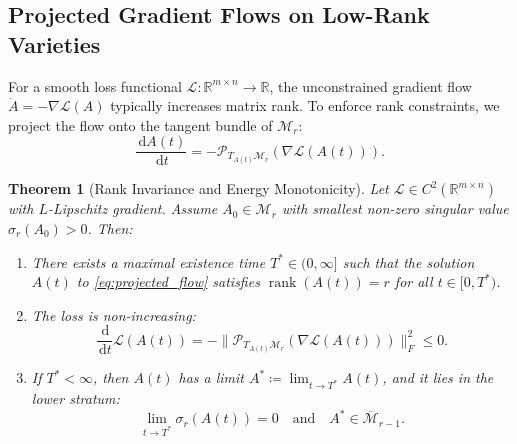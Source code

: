 \documentclass[11pt,a4paper,reqno]{amsart}
\newtheorem{theorem}{Theorem}[section]
\theoremstyle{definition}
\numberwithin{equation}{section}
\providecommand{\R}{\mathbb{R}}
\newcommand{\rank}{\operatorname{rank}}
\newcommand{\dif}{\,\mathrm{d}}
\providecommand{\R}{\mathbb{R}}
\begin{document}
\subsection{Projected Gradient Flows on Low-Rank Varieties}
For a smooth loss functional $\mathcal{L} \colon \R^{m \times n} \to \R$, the unconstrained gradient flow $\dot{A} = -\nabla \mathcal{L}(A)$ typically increases matrix rank. To enforce rank constraints, we project the flow onto the tangent bundle of $\mathcal{M}_r$:
\begin{equation}
    \label{eq:projected_flow}
    \frac{\dif A(t)}{\dif t} = -\mathcal{P}_{T_{A(t)} \mathcal{M}_r}(\nabla \mathcal{L}(A(t))).
\end{equation}

\begin{theorem}[Rank Invariance and Energy Monotonicity]
\label{thm:rank_preservation}
Let $\mathcal{L} \in C^2(\R^{m \times n})$ with $L$-Lipschitz gradient. Assume $A_0 \in \mathcal{M}_r$ with smallest non-zero singular value $\sigma_r(A_0) > 0$. Then:
\begin{enumerate}[label=(\roman*)]
    \item There exists a maximal existence time $T^* \in (0, \infty]$ such that the solution $A(t)$ to \eqref{eq:projected_flow} satisfies $\rank(A(t)) = r$ for all $t \in [0, T^*)$.
    \item The loss is non-increasing:
    \begin{equation}
        \frac{\dif}{\dif t} \mathcal{L}(A(t)) = -\|\mathcal{P}_{T_{A(t)} \mathcal{M}_r}(\nabla \mathcal{L}(A(t)))\|_F^2 \le 0.
    \end{equation}
    \item If $T^* < \infty$, then $A(t)$ has a limit $A^* \coloneqq \lim_{t \to T^*} A(t)$, and it lies in the lower stratum:
    \begin{equation}
        \lim_{t \to T^*} \sigma_r(A(t)) = 0 \quad \text{and} \quad A^* \in \overline{\mathcal{M}}_{r-1}.
    \end{equation}
\end{enumerate}
\end{theorem}
\end{document}
